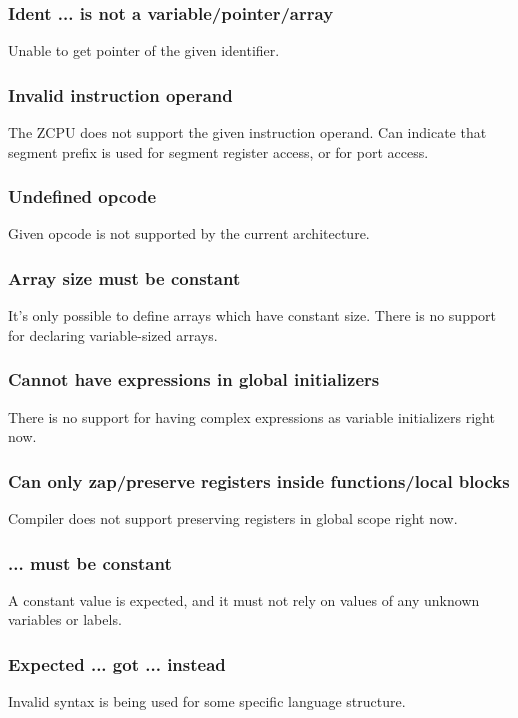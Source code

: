 \subsubsection{Ident ... is not a variable/pointer/array}
Unable to get pointer of the given identifier.

\subsubsection{Invalid instruction operand}
The ZCPU does not support the given instruction operand. Can indicate that segment prefix is used for segment register access, or for port access.

\subsubsection{Undefined opcode}
Given opcode is not supported by the current architecture.

\subsubsection{Array size must be constant}
It's only possible to define arrays which have constant size. There is no support for declaring variable-sized arrays.

\subsubsection{Cannot have expressions in global initializers}
There is no support for having complex expressions as variable initializers right now.

\subsubsection{Can only zap/preserve registers inside functions/local blocks}
Compiler does not support preserving registers in global scope right now.

\subsubsection{... must be constant}
A constant value is expected, and it must not rely on values of any unknown variables or labels.

\subsubsection{Expected ... got ... instead}
Invalid syntax is being used for some specific language structure.


